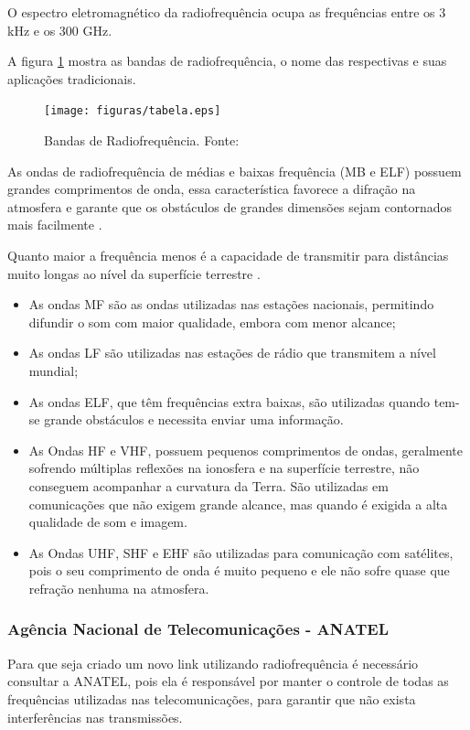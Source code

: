 O espectro eletromagnético da radiofrequência ocupa as frequências entre os 3 kHz e os 300 GHz. 

A figura \ref{fig:tabelafre} mostra as bandas de radiofrequência, o nome das respectivas e suas aplicações tradicionais.

\begin{figure}[H]
	\centering
	  \texttt{[image: figuras/tabela.eps]}
	\caption{Bandas de Radiofrequência. Fonte: \cite{tabela}}
	\label{fig:tabelafre}
\end{figure}

As ondas de radiofrequência de médias e baixas frequência (MB e ELF) possuem grandes comprimentos de onda, essa característica favorece a difração na atmosfera e garante que os obstáculos de grandes dimensões sejam contornados mais facilmente \cite{Rappaport2}.

Quanto maior a frequência menos é a capacidade de transmitir para distâncias muito longas ao nível da superfície terrestre \cite{VALLE1}. 

\begin{itemize}
	\item As ondas MF são as ondas utilizadas nas estações nacionais, permitindo difundir o som com maior qualidade, embora com menor alcance;
	\item As ondas LF são utilizadas nas estações de rádio que transmitem a nível mundial;
	\item As ondas ELF, que têm frequências extra baixas, são utilizadas quando tem-se grande obstáculos e necessita enviar uma informação. 
	\item As Ondas HF e VHF, possuem pequenos comprimentos de ondas, geralmente sofrendo múltiplas reflexões na ionosfera e na superfície terrestre, não conseguem acompanhar a curvatura da Terra. São utilizadas em comunicações que não exigem grande alcance, mas quando é exigida a alta qualidade de som e imagem.
	\item As Ondas UHF, SHF e EHF são utilizadas para comunicação com satélites, pois o seu comprimento de onda é muito pequeno e ele não sofre quase que refração nenhuma na atmosfera. 
\end{itemize} 

\subsubsection{Agência Nacional de Telecomunicações - ANATEL}

Para que seja criado um novo link utilizando radiofrequência é necessário consultar a ANATEL, pois ela é responsável por manter o controle de todas as frequências utilizadas nas telecomunicações, para garantir que não exista interferências nas transmissões.

